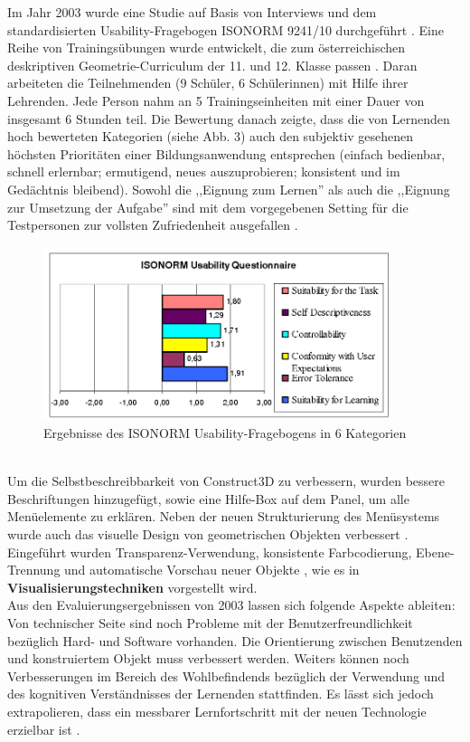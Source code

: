 \documentclass[deutsch]{llncs}
\begin{document}
\noindent Im Jahr 2003 wurde eine Studie auf Basis von Interviews und dem standardisierten Usability-Fragebogen ISONORM 9241/10 durchgeführt \cite{Kaufmann_summaryof}. Eine Reihe von Trainingsübungen wurde entwickelt, die zum österreichischen deskriptiven Geometrie-Curriculum der 11. und 12. Klasse passen \cite{Kaufmann_summaryof}.  Daran arbeiteten die Teilnehmenden (9 Schüler, 6 Schülerinnen) mit Hilfe ihrer Lehrenden. Jede Person nahm an 5 Trainingseinheiten mit einer Dauer von insgesamt 6 Stunden teil. Die Bewertung danach zeigte, dass die von Lernenden hoch bewerteten Kategorien (siehe Abb. \label{stat1}3) auch den subjektiv gesehenen höchsten Prioritäten einer Bildungsanwendung entsprechen (einfach bedienbar, schnell erlernbar; ermutigend, neues auszuprobieren; konsistent und im Gedächtnis bleibend)\cite{Kaufmann_summaryof}. Sowohl die ,,Eignung zum Lernen'' als auch die ,,Eignung zur Umsetzung der Aufgabe'' sind mit dem vorgegebenen Setting für die Testpersonen zur vollsten Zufriedenheit ausgefallen \cite{1667626}.
\begin{figure}[t]
	\centering
	\includegraphics[width=0.9\textwidth]{figures/isonorm}
	\caption{Ergebnisse des ISONORM Usability-Fragebogens in 6 Kategorien \cite{Kaufmann_summaryof}}
	\label{fig:isonorm}
\end{figure}
\\Um die Selbstbeschreibbarkeit von Construct3D zu verbessern, wurden bessere Beschriftungen hinzugefügt, sowie eine Hilfe-Box auf dem Panel, um alle Menüelemente zu erklären. Neben der neuen Strukturierung des Menüsystems wurde auch das visuelle Design von geometrischen Objekten verbessert  \cite{Kaufmann_summaryof}.  Eingeführt wurden Transparenz-Verwendung, konsistente Farbcodierung, Ebene-Trennung und automatische Vorschau neuer Objekte \cite{Kaufmann_summaryof}, wie es in \textbf{Visualisierungstechniken} vorgestellt wird.\\
Aus den Evaluierungsergebnissen von 2003 lassen sich folgende Aspekte ableiten: Von technischer Seite sind noch Probleme mit der Benutzerfreundlichkeit bezüglich Hard- und Software vorhanden. Die Orientierung zwischen Benutzenden und konstruiertem Objekt muss verbessert werden. Weiters können noch Verbesserungen im Bereich des Wohlbefindends bezüglich der Verwendung und des kognitiven Verständnisses der Lernenden stattfinden. Es lässt sich jedoch extrapolieren, dass ein messbarer Lernfortschritt mit der neuen Technologie erzielbar ist \cite{article}. \\
\end{document}
